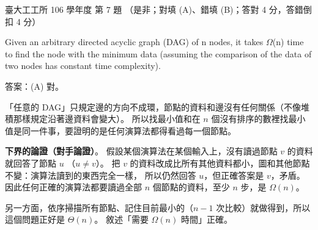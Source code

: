 \begin{pastexam}[label={px:ntu-106-ie-ds-07}]{臺大工工所 106 學年度 第 7 題}
（是非；對填 (A)、錯填 (B)；答對 4 分，答錯倒扣 4 分）

Given an arbitrary directed acyclic graph (DAG) of n nodes, it takes $\Omega$(n) time to find the node
with the minimum data (assuming the comparison of the data of two nodes has constant time complexity).
\end{pastexam}

\begin{pastsoln}
答案：(A) 對。

「任意的 DAG」只規定邊的方向不成環，節點的資料和邊沒有任何關係（不像堆積那樣規定沿著邊資料會變大）。
所以找最小值和在 $n$ 個沒有排序的數裡找最小值是同一件事，要證明的是任何演算法都得看過每一個節點。

\textbf{下界的論證（對手論證）}。 假設某個演算法在某個輸入上，沒有讀過節點 $v$ 的資料就回答了節點 $u$
（$u \ne v$）。 把 $v$ 的資料改成比所有其他資料都小，圖和其他節點不變：演算法讀到的東西完全一樣，
所以仍然回答 $u$，但正確答案是 $v$，矛盾。 因此任何正確的演算法都要讀過全部 $n$ 個節點的資料，至少
$n$ 步，是 $\Omega(n)$。

另一方面，依序掃描所有節點、記住目前最小的（$n - 1$ 次比較）就做得到，所以這個問題正好是 $\Theta(n)$。
敘述「需要 $\Omega(n)$ 時間」正確。
\end{pastsoln}

